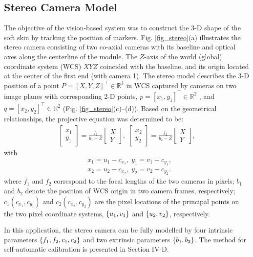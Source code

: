 \documentclass[10pt,letterpaper,journal,final,twoside,twocolumn,nofonttune]{IEEEtran}
\begin{document}
\subsection{Stereo Camera Model}
The objective of the vision-based system was to construct the 3-D shape of the soft skin by tracking the position of markers. Fig. \ref{fig_stereo}(a) illustrates the stereo camera consisting of two co-axial cameras with its baseline and optical axes along the centerline of the module. The $Z$-axis of the world (global) coordinate system (WCS) $XYZ$ coincided with the baseline, and its origin located at the center of the first end (with camera 1). The stereo model describes the 3-D position of a point $P=\left [X,Y,Z\right ]^\top\in \mathbb{R}^3$ in WCS captured by cameras on two image planes with corresponding 2-D points, $p=\left [x_1,y_1\right ]^\top\in \mathbb{R}^2$ , and $q=\left [x_2,y_2\right ]^\top\in \mathbb{R}^2$ (Fig. \ref{fig_stereo}(c)--(d)). Based on the geometrical relationships, the projective equation was determined to be:
\begin{align}
\begin{bmatrix} x_1 \\ y_1 \end{bmatrix} = \frac{f_1}{b_1+Z}\begin{bmatrix} X \\ Y \end{bmatrix},\;  
\begin{bmatrix} x_2 \\ y_2 \end{bmatrix} = \frac{f_2}{b_2-Z}\begin{bmatrix} X \\ Y \end{bmatrix},
\label{eq_stereo_1}
\end{align}
with 
\begin{align}
&x_1=u_1-c_{x_1},\;  y_1=v_1-c_{y_1}, \\
&x_2=u_2-c_{x_2},\;  y_2=v_2-c_{y_2}.
\end{align}
where $f_1$ and $f_2$ correspond to the focal lengths of the two cameras in pixels; $b_1$ and $b_2$ denote the position of WCS origin in two camera frames, respectively; $c_1(c_{x_1},c_{y_1})$ and $c_2(c_{x_2},c_{y_2})$ are the pixel locations of the principal points on the two pixel coordinate systems, $\set{u_1, v_1}$ and $\set{u_2, v_2}$, respectively. 

In this application, the stereo camera can be fully modelled by four intrinsic parameters $\set{f_1,f_2,c_{1},c_{2}}$ and two extrinsic parameters $\set{b_{1},b_{2}}$. The method for self-automatic calibration is presented in Section IV-D. 
\end{document}
